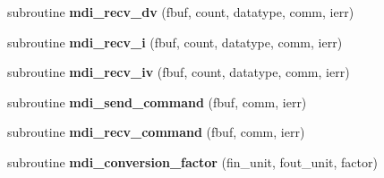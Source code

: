 \begin{DoxyCompactItemize}
\item 
\hypertarget{classmdi_a702f07d3972442a7e2192344cbc39591}{subroutine {\bfseries mdi\-\_\-recv\-\_\-dv} (fbuf, count, datatype, comm, ierr)}\label{classmdi_a702f07d3972442a7e2192344cbc39591}

\item 
\hypertarget{classmdi_a6db12fbef0c2a759ef7b44d55ade27e6}{subroutine {\bfseries mdi\-\_\-recv\-\_\-i} (fbuf, count, datatype, comm, ierr)}\label{classmdi_a6db12fbef0c2a759ef7b44d55ade27e6}

\item 
\hypertarget{classmdi_a44067a3dc1c77a4c0263f070e65e0da6}{subroutine {\bfseries mdi\-\_\-recv\-\_\-iv} (fbuf, count, datatype, comm, ierr)}\label{classmdi_a44067a3dc1c77a4c0263f070e65e0da6}

\item 
\hypertarget{classmdi_ab16198c5de2102500ab27e0d69df8487}{subroutine {\bfseries mdi\-\_\-send\-\_\-command} (fbuf, comm, ierr)}\label{classmdi_ab16198c5de2102500ab27e0d69df8487}

\item 
\hypertarget{classmdi_a2b09a1c50a57cc6fe253985b530993ec}{subroutine {\bfseries mdi\-\_\-recv\-\_\-command} (fbuf, comm, ierr)}\label{classmdi_a2b09a1c50a57cc6fe253985b530993ec}

\item 
\hypertarget{classmdi_aae00c1e188d87821449bbe1a03e7b337}{subroutine {\bfseries mdi\-\_\-conversion\-\_\-factor} (fin\-\_\-unit, fout\-\_\-unit, factor)}\label{classmdi_aae00c1e188d87821449bbe1a03e7b337}

\end{DoxyCompactItemize}
